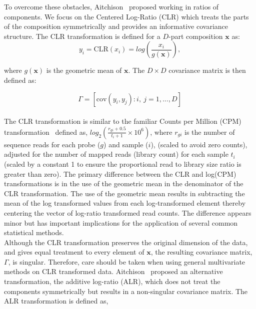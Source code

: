 \documentclass{article}\usepackage[]{graphicx}\usepackage[]{color}
\theoremstyle{definition}
\begin{document}
To overcome these obstacles, Aitchison~\cite{Aitchison1980} proposed working in ratios of components. We focus on the Centered Log-Ratio (CLR) which treats the parts of the composition symmetrically and provides an informative covariance structure.  The CLR transformation is defined for a $D$-part composition $\mathbf{x}$ as:
\begin{equation}
y_i  = \text{CLR}(x_i) = log \left(\frac{x_i}{g(\mathbf{x})} \right),
\label{clr}
\end{equation}

where $g(\mathbf{x})$ is the geometric mean of $\mathbf{x}$.  The $D \times D$ covariance matrix is then defined as:

\begin{equation}
\Gamma = \left[\text{cov}\left(y_i, y_j \right): i,\ j = 1, ..., D \right]
\label{gamma}
\end{equation}
\\

The CLR transformation is similar to the familiar Counts per Million (CPM) transformation~\cite{Law2014} defined as, $log_2 \left(\frac{r_{gi}+0.5}{t_i+1} \times 10^6 \right)$, where $r_{gi}$ is the number of sequence reads for each probe ($g$) and sample ($i$), (scaled to avoid zero counts), adjusted for the number of mapped reads (library count) for each sample $t_i$ (scaled by a constant 1 to ensure the proportional read to library size ratio is greater than zero). The primary difference between the CLR and log(CPM) transformations is in the use of the geometric mean in the denominator of the CLR transformation. The use of the geometric mean results in subtracting the mean of the log transformed values from each log-transformed element thereby centering the vector of log-ratio transformed read counts. The difference appears minor but has important implications for the application of several common statistical methods.\\


Although the CLR transformation preserves the original dimension of the data, and gives equal treatment to every element of $\mathbf{x}$, the resulting covariance matrix, $\Gamma$, is singular.  Therefore, care should be taken when using general multivariate methods on CLR transformed data. Aitchison~\cite{Aitchison1986} proposed an alternative transformation, the additive log-ratio (ALR), which does not treat the components symmetrically but results in a non-singular covariance matrix.  The ALR transformation is defined as,
\end{document}
